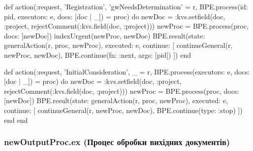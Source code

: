\documentclass{article}
\let\originalfootnotesize\footnotesize
\let\oldverbatim\verbatim
\let\oldendverbatim\endverbatim
\renewenvironment{verbatim}{\originalfootnotesize\oldverbatim}{\oldendverbatim}
\begin{document}
\begin{verbatim}
  def action({:request, 'Registration', 'gwNeedsDetermination'} = r,
    BPE.process(id: pid, executors: e, docs: [doc | _]) = proc) do
    newDoc = :kvs.setfield(doc, :project, rejectComment(:kvs.field(doc, :project)))
    newProc = BPE.process(proc, docs: [newDoc])
    indexUrgent(newProc, newDoc)
    BPE.result(state: generalAction(r, proc, newProc), executed: e,
      continue: [
        continueGeneral(r, newProc, newDoc),
        BPE.continue(fn: :next, args: [pid])
      ])
  end

  def action({:request, 'InitialConsideration', _} = r,
    BPE.process(executors: e, docs: [doc | _]) = proc) do
    newDoc = :kvs.setfield(doc, :project, rejectComment(:kvs.field(doc, :project)))
    newProc = BPE.process(proc, docs: [newDoc])
    BPE.result(state: generalAction(r, proc, newProc), executed: e,
      continue: [
        continueGeneral(r, newProc, newDoc),
        BPE.continue(type: :stop)
      ])
  end
end
\end{verbatim}
\endgroup

\subsubsection{newOutputProc.ex (Процес обробки вихідних документів)}
\end{document}

